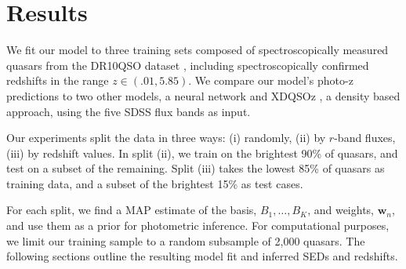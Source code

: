 \documentclass{article} %
\begin{document}




\section{Results}
\label{sec:experiments}
We fit our model to three training sets composed of spectroscopically measured quasars from the DR10QSO dataset \cite{paris2014sloan}, including spectroscopically confirmed redshifts in the range ${z \in (.01,  5.85)}$.  
We compare our model's photo-z predictions to two other models, a neural network \cite{brescia2013photometric} and XDQSOz \cite{bovy2012photometric}, a density based approach, using the five SDSS flux bands as input.  

Our experiments split the data in three ways: (i) randomly, (ii) by $r$-band fluxes, (iii) by redshift values.  In split (ii), we train on the brightest 90\% of quasars, and test on a subset of the remaining.  Split (iii) takes the lowest 85\% of quasars as training data, and a subset of the brightest 15\% as test cases.  

For each split, we find a MAP estimate of the basis, $B_1, \dots, B_K$, and weights, $\mathbf{w}_n$, and use them as a prior for photometric inference.  For computational purposes, we limit our training sample to a random subsample of 2,000 quasars.   
The following sections outline the resulting model fit and inferred SEDs and redshifts. 
\end{document}
